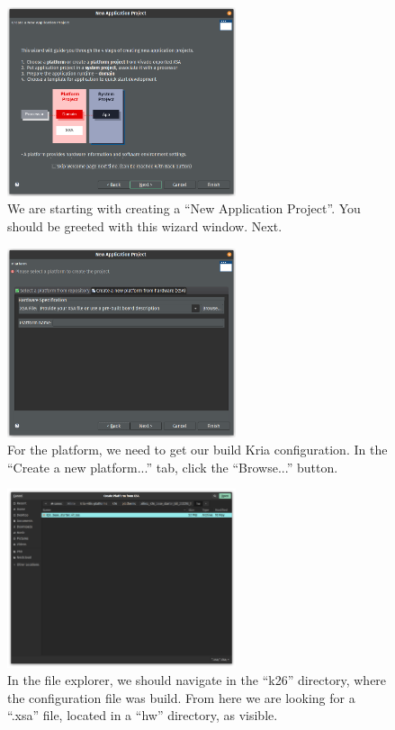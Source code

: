 \documentclass[10pt]{article}
\begin{document}
\begin{figure}[H]
  \centering
  \includegraphics[width=0.6\textwidth]{./img/vitis_new/project1}
  \caption{We are starting with creating a ``New Application Project''. You should be greeted with this wizard window. Next.}
\end{figure}

\begin{figure}[H]
  \centering
  \includegraphics[width=0.6\textwidth]{./img/vitis_new/project2}
  \caption{For the platform, we need to get our build Kria configuration. In the ``Create a new platform...'' tab, click the ``Browse...'' button.}
\end{figure}

\begin{figure}[H]
  \centering
  \includegraphics[width=0.6\textwidth]{./img/vitis_new/project3}
  \caption{In the file explorer, we should navigate in the ``k26'' directory, where the configuration file was build.
    From here we are looking for a ``.xsa'' file, located in a ``hw'' directory, as visible.}
\end{figure}
\end{document}
